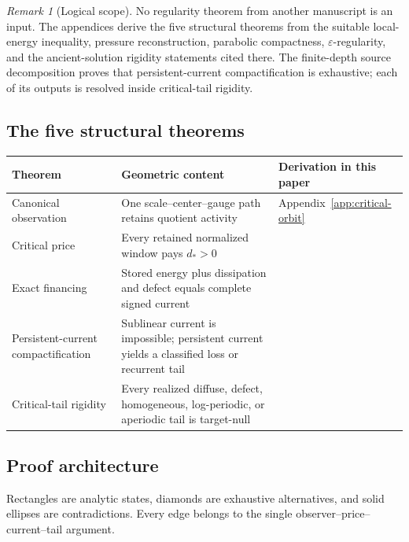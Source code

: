 \documentclass[11pt]{amsart}
\numberwithin{equation}{section}
\theoremstyle{plain}
\theoremstyle{definition}
\theoremstyle{remark}
\newtheorem{remark}[remark]{Remark}
\begin{document}
\begin{remark}[Logical scope]
\label{rem:logical-scope}
No regularity theorem from another manuscript is an input.  The appendices
derive the five structural theorems from the suitable local-energy inequality,
pressure reconstruction, parabolic compactness, \(\varepsilon\)-regularity,
and the ancient-solution rigidity statements cited there.  The finite-depth
source decomposition proves that persistent-current compactification is
exhaustive; each of its outputs is resolved inside critical-tail rigidity.
\end{remark}

\subsection*{The five structural theorems}

\begin{center}
\small
\begin{tabular}{@{}L{0.28\textwidth}L{0.25\textwidth}L{0.35\textwidth}@{}}
\toprule
Theorem & Geometric content & Derivation in this paper \\
\midrule
Canonical observation & One scale--center--gauge path retains quotient activity & Appendix~\ref{app:critical-orbit} \\
Critical price & Every retained normalized window pays \(d_*>0\) &  \\
Exact financing & Stored energy plus dissipation and defect equals complete signed current &  \\
Persistent-current compactification & Sublinear current is impossible; persistent current yields a classified loss or recurrent tail &  \\
Critical-tail rigidity & Every realized diffuse, defect, homogeneous, log-periodic, or aperiodic tail is target-null &  \\
\bottomrule
\end{tabular}
\end{center}

\subsection*{Proof architecture}

Rectangles are analytic states, diamonds are exhaustive alternatives, and
solid ellipses are contradictions.  Every edge belongs to the single
observer--price--current--tail argument.
\end{document}
